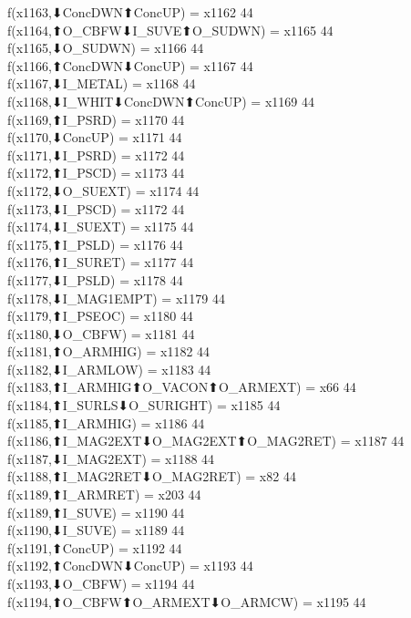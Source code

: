 f(x1163,⬇ConcDWN⬆ConcUP) = x1162 {44} \\
f(x1164,⬆O_CBFW⬇I_SUVE⬆O_SUDWN) = x1165 {44} \\
f(x1165,⬇O_SUDWN) = x1166 {44} \\
f(x1166,⬆ConcDWN⬇ConcUP) = x1167 {44} \\
f(x1167,⬇I_METAL) = x1168 {44} \\
f(x1168,⬇I_WHIT⬇ConcDWN⬆ConcUP) = x1169 {44} \\
f(x1169,⬆I_PSRD) = x1170 {44} \\
f(x1170,⬇ConcUP) = x1171 {44} \\
f(x1171,⬇I_PSRD) = x1172 {44} \\
f(x1172,⬆I_PSCD) = x1173 {44} \\
f(x1172,⬇O_SUEXT) = x1174 {44} \\
f(x1173,⬇I_PSCD) = x1172 {44} \\
f(x1174,⬇I_SUEXT) = x1175 {44} \\
f(x1175,⬆I_PSLD) = x1176 {44} \\
f(x1176,⬆I_SURET) = x1177 {44} \\
f(x1177,⬇I_PSLD) = x1178 {44} \\
f(x1178,⬇I_MAG1EMPT) = x1179 {44} \\
f(x1179,⬆I_PSEOC) = x1180 {44} \\
f(x1180,⬇O_CBFW) = x1181 {44} \\
f(x1181,⬆O_ARMHIG) = x1182 {44} \\
f(x1182,⬇I_ARMLOW) = x1183 {44} \\
f(x1183,⬆I_ARMHIG⬆O_VACON⬆O_ARMEXT) = x66 {44} \\
f(x1184,⬆I_SURLS⬇O_SURIGHT) = x1185 {44} \\
f(x1185,⬆I_ARMHIG) = x1186 {44} \\
f(x1186,⬆I_MAG2EXT⬇O_MAG2EXT⬆O_MAG2RET) = x1187 {44} \\
f(x1187,⬇I_MAG2EXT) = x1188 {44} \\
f(x1188,⬆I_MAG2RET⬇O_MAG2RET) = x82 {44} \\
f(x1189,⬆I_ARMRET) = x203 {44} \\
f(x1189,⬆I_SUVE) = x1190 {44} \\
f(x1190,⬇I_SUVE) = x1189 {44} \\
f(x1191,⬆ConcUP) = x1192 {44} \\
f(x1192,⬆ConcDWN⬇ConcUP) = x1193 {44} \\
f(x1193,⬇O_CBFW) = x1194 {44} \\
f(x1194,⬆O_CBFW⬆O_ARMEXT⬇O_ARMCW) = x1195 {44} \\
